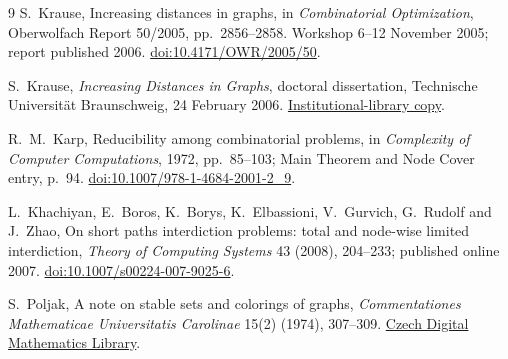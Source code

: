 \documentclass[11pt]{article}
\begin{document}
\begin{thebibliography}{9}
S.~Krause, Increasing distances in graphs, in \emph{Combinatorial Optimization},
Oberwolfach Report 50/2005, pp.~2856--2858. Workshop 6--12 November 2005;
report published 2006.
\href{https://doi.org/10.4171/OWR/2005/50}{doi:10.4171/OWR/2005/50}.

S.~Krause, \emph{Increasing Distances in Graphs}, doctoral dissertation,
Technische Universit\"at Braunschweig, 24 February 2006.
\href{https://webdoc.sub.gwdg.de/ebook/dissts/Braunschweig/Krause2006.pdf}{Institutional-library copy}.

R.~M.~Karp, Reducibility among combinatorial problems, in
\emph{Complexity of Computer Computations}, 1972, pp.~85--103;
Main Theorem and Node Cover entry, p.~94.
\href{https://doi.org/10.1007/978-1-4684-2001-2_9}{doi:10.1007/978-1-4684-2001-2\_9}.

L.~Khachiyan, E.~Boros, K.~Borys, K.~Elbassioni, V.~Gurvich,
G.~Rudolf and J.~Zhao, On short paths interdiction problems: total and
node-wise limited interdiction, \emph{Theory of Computing Systems}
43 (2008), 204--233; published online 2007.
\href{https://doi.org/10.1007/s00224-007-9025-6}{doi:10.1007/s00224-007-9025-6}.

S.~Poljak, A note on stable sets and colorings of graphs,
\emph{Commentationes Mathematicae Universitatis Carolinae}
15(2) (1974), 307--309.
\href{https://dml.cz/handle/10338.dmlcz/105554}{Czech Digital Mathematics Library}.
\end{thebibliography}
\end{document}
